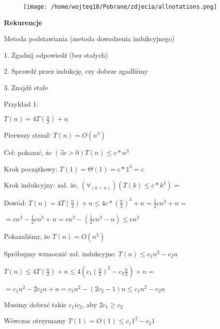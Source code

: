 \documentclass{article}
\begin{document}
\vspace{1\baselineskip}
\begin{figure}[H]
    \centering
    \texttt{[image: /home/wojteq18/Pobrane/zdjecia/allnotations.png]}
    \label{fig:example_image}
\end{figure}
\vspace{1\baselineskip}
\textbf{Rekurencje} \par
\vspace{1\baselineskip}
Metoda podstawiania (metoda dowodzenia indukcyjnego) \par
    \hspace{20pt}1. Zgadnij odpowiedź (bez stałych) \par
    \hspace{20pt}2. Sprawdź przez indukcję, czy dobrze zgadliśmy \par
    \hspace{20pt}3. Znajdź stałe \par
\vspace{1\baselineskip}
Przykład 1: \par
\vspace{1\baselineskip}
$T(n) = 4T(\frac{n}{2}) + n$   \par
Pierwszy strzał: $T(n) = O(n^3)$ \par
Cel: pokazać, że $(\exists c > 0) T(n) \leq c * n^3$ \par
Krok początkowy: $T(1) = \Theta (1) = c * 1^3 = c$ \par
Krok indukcyjny: zał. że, $(\forall_(k < n)) (T(k) \leq c * k^3) = $ \par
Dowód: $T(n) = 4T(\frac{n}{2}) + n \leq 4c * (\frac{n}{2})^3 + n = \frac{1}{2}cn^3 + n =$ \par
$= cn^3 - \frac{1}{2}cn^3 + n = cn^3 - (\frac{1}{2}cn^3 - n) \leq cn^3$ \par
Pokazaliśmy, że $T(n) = O(n^2)$ \par
\vspace{1\baselineskip}
Spróbujmy wzmocnić zał. indukcyjne: $T(n) \leq c_1 n^2 - c_2 n$ \par
$T(n) \leq 4T(\frac{n}{2}) + n \leq 4(c_1 (\frac{n}{2})^2 - c_2 \frac{n}{2}) + n = $ \par
$ = c_1 n^2 - 2c_2 n + n = c_1 n^2 - (2c_2 - 1)n \leq c_1 n^2 - c_2 n$ \par
Musimy dobrać takie $c_1 i c _2$, aby $2c_1 \geq c_2$ \par
Wówczas otrzymamy $T(1) = O(1) \leq c_1 1^2 - c_2 1$ \par
\vspace{9\baselineskip}
\end{document}
